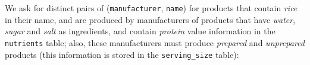 \begin{experiment-withrun}





\end{experiment-withrun}


\begin{experiment-withrun}\label{advanced-experiment:3}
We ask for distinct pairs of (\texttt{manufacturer}, \texttt{name}) for products that contain \textit{rice} in their name, and are produced by manufacturers of products that have \textit{water}, \textit{sugar} and \textit{salt} as  ingredients, and contain \textit{protein} value information in the \texttt{nutrients} table; also, these manufacturers must produce \textit{prepared} and \textit{unprepared} products (this information is stored in the \texttt{serving\_size} table):\footnotemark



\end{experiment-withrun}
